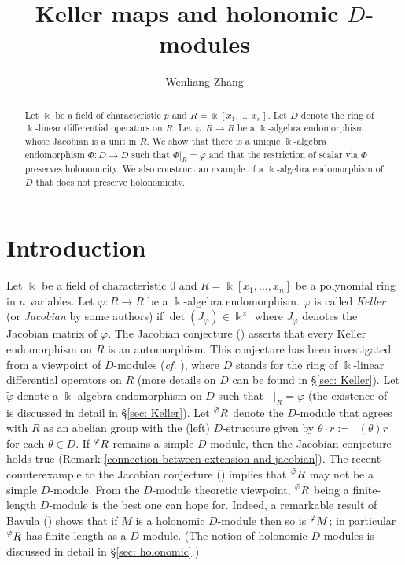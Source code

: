 \documentclass[11pt]{amsart}
\title{Keller maps and holonomic $D$-modules}
\author{Wenliang Zhang}
\theoremstyle{definition}
\theoremstyle{remark}
\numberwithin{equation}{subsection}
\DeclareMathOperator{\kk}{\Bbbk}
\DeclareMathOperator{\tv}{\tilde{\varphi}}
\begin{document}
\maketitle

\begin{abstract}
Let $\kk$ be a field of characteristic $p$ and $R=\kk[x_1,\dots,x_n]$. Let $D$ denote the ring of $\kk$-linear differential operators on $R$. Let $\varphi:R\to R$ be a $\kk$-algebra endomorphism whose Jacobian is a unit in $R$. We show that there is a unique $\kk$-algebra endomorphism $\Phi:D\to D$ such that $\Phi|_R=\varphi$ and that the restriction of scalar via $\Phi$ preserves holonomicity. We also construct an example of a $\kk$-algebra endomorphism of $D$ that does not preserve holonomicity.
\end{abstract}

\section{Introduction}
Let $\kk$ be a field of characteristic 0 and $R=\kk[x_1,\dots,x_n]$ be a polynomial ring in $n$ variables. Let $\varphi:R\to R$ be a $\kk$-algebra endomorphism. $\varphi$ is called {\it Keller} (or \emph{Jacobian} by some authors) if $\det(J_{\varphi})\in \kk^\times$ where $J_{\varphi}$ denotes the Jacobian matrix of $\varphi$. The Jacobian conjecture (\cite{Keller1939}) asserts that every Keller endomorphism on $R$ is an automorphism. This conjecture has been investigated from a viewpoint of $D$-modules ({\it cf.} \cite{Dixmier1968, BCW82, Bass89, BavulaDixmierConjecture, BKKpaper}), where $D$ stands for the ring of $\kk$-linear differential operators on $R$ (more details on $D$ can be found in \S\ref{sec: Keller}). Let $\tilde{\varphi}$ denote a $\kk$-algebra endomorphism on $D$ such that $\tv|_R=\varphi$ (the existence of $\tv$ is discussed in detail in \S\ref{sec: Keller}). Let $\prescript{\tv}{}R$ denote the $D$-module that agrees with $R$ as an abelian group with the (left) $D$-structure given by $\theta\cdot r:=\tv(\theta)r$ for each $\theta\in D$. If $\prescript{\tilde{\varphi}}{}R$ remains a simple $D$-module, then the Jacobian conjecture holds true (Remark \ref{connection between extension and jacobian}). The recent counterexample to the Jacobian conjecture (\cite{Alpoge2026}) implies that $\prescript{\tv}{}R$ may not be a simple $D$-module. From the $D$-module theoretic viewpoint, $\prescript{\tv}{}R$ being a finite-length $D$-module is the best one can hope for. Indeed, a remarkable result of Bavula (\cite[Theorem 1.3]{BavulaAnnals}) shows that if $M$ is a holonomic $D$-module then so is $\prescript{\tv}{}M$; in particular $\prescript{\tv}{}R$ has finite length as a $D$-module. (The notion of holonomic $D$-modules is discussed in detail in \S\ref{sec: holonomic}.)
\end{document}
